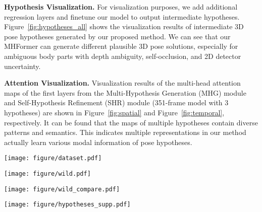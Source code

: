 \documentclass[10pt,twocolumn,letterpaper]{article}
\begin{document}
\noindent \textbf{Hypothesis Visualization.}
For visualization purposes, we add additional regression layers and finetune our model to output intermediate hypotheses. 
Figure~\ref{fig:hypotheses_all} shows the visualization results of intermediate 3D pose hypotheses generated by our proposed method. 
We can see that our MHFormer can generate different plausible 3D pose solutions, especially for ambiguous body parts with depth ambiguity, self-occlusion, and 2D detector uncertainty. 

\noindent \textbf{Attention Visualization.}
Visualization results of the multi-head attention maps of the first layers from the Multi-Hypothesis Generation (MHG) module and Self-Hypothesis Refinement (SHR) module (351-frame model with 3 hypotheses) are shown in Figure~\ref{fig:spatial} and Figure~\ref{fig:temporal}, respectively. 
It can be found that the maps of multiple hypotheses contain diverse patterns and semantics. 
This indicates multiple representations in our method actually learn various modal information of pose hypotheses. 

\begin{figure*}[htb]
   \centering
   \texttt{[image: figure/dataset.pdf]}
   \caption
   {Qualitative results of our proposed method on Human3.6M dataset (first 1 row) and MPI-INF-3DHP dataset (last 2 rows). 
   }
   \label{fig:dataset}
   \vspace{-0.1cm}
\end{figure*}

\begin{figure*}[htb]
   \centering
   \texttt{[image: figure/wild.pdf]}
   \caption
   {Qualitative results of our proposed method on challenging in-the-wild videos. 
   }
   \label{fig:wild}
   \vspace{-0.1cm}
\end{figure*}

\begin{figure*}[htb]
   \centering
   \texttt{[image: figure/wild\_compare.pdf]}
   \caption
   {Qualitative comparison among the proposed method (MHFormer), the baseline method, and the previous state-of-the-art method (PoseFormer)~\cite{poseformer} on challenging wild videos. 
   Wrong estimations are highlighted by yellow arrows. 
   }
   \label{fig:wild_compare}
   \vspace{-0.4cm}
\end{figure*}

\begin{figure*}[htb]
   \centering
   \texttt{[image: figure/hypotheses\_supp.pdf]}
   \caption
   {Diverse 3D pose hypotheses generated by MHFormer. 
   For easy illustration, we color-code the hypotheses to show the difference among them, and the hypotheses are shown from two perspectives. 
   Green colored 3D pose corresponds to the final synthesized estimation of our method. 
   }
   \label{fig:hypotheses_all}
\end{figure*}
\end{document}
